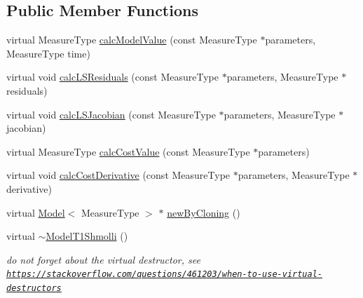 \subsection*{Public Member Functions}
\begin{DoxyCompactItemize}
\item 
virtual Measure\-Type \hyperlink{class_ox_1_1_model_t1_shmolli_a72576d4db2ff938037c3d9d4fe25b9d7}{calc\-Model\-Value} (const Measure\-Type $\ast$parameters, Measure\-Type time)
\item 
virtual void \hyperlink{class_ox_1_1_model_t1_shmolli_ae393758f44f51e2fddae4c3c919fe4db}{calc\-L\-S\-Residuals} (const Measure\-Type $\ast$parameters, Measure\-Type $\ast$residuals)
\item 
virtual void \hyperlink{class_ox_1_1_model_t1_shmolli_a667e5c9088ba65e0cba506246671e3da}{calc\-L\-S\-Jacobian} (const Measure\-Type $\ast$parameters, Measure\-Type $\ast$jacobian)
\item 
virtual Measure\-Type \hyperlink{class_ox_1_1_model_t1_shmolli_a0f9b89832a6321b5b54abb9e219e803d}{calc\-Cost\-Value} (const Measure\-Type $\ast$parameters)
\item 
virtual void \hyperlink{class_ox_1_1_model_t1_shmolli_afaadbc879361f3ea674fe79a9fc1cf49}{calc\-Cost\-Derivative} (const Measure\-Type $\ast$parameters, Measure\-Type $\ast$derivative)
\item 
virtual \hyperlink{class_ox_1_1_model}{Model}$<$ Measure\-Type $>$ $\ast$ \hyperlink{class_ox_1_1_model_t1_shmolli_a846fb817183738d5c2b3f9f126c1597b}{new\-By\-Cloning} ()
\item 
\hypertarget{class_ox_1_1_model_t1_shmolli_ad5dd9c59e049f1c356541ac278bc1e18}{virtual \hyperlink{class_ox_1_1_model_t1_shmolli_ad5dd9c59e049f1c356541ac278bc1e18}{$\sim$\-Model\-T1\-Shmolli} ()}\label{class_ox_1_1_model_t1_shmolli_ad5dd9c59e049f1c356541ac278bc1e18}

\begin{DoxyCompactList}\small\item\em do not forget about the virtual destructor, see \href{https://stackoverflow.com/questions/461203/when-to-use-virtual-destructors}{\tt https\-://stackoverflow.\-com/questions/461203/when-\/to-\/use-\/virtual-\/destructors} \end{DoxyCompactList}\end{DoxyCompactItemize}
